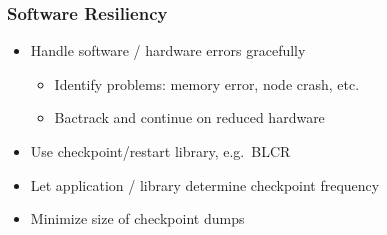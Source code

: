 \begin{frame}[fragile] \frametitle{Software Resiliency}
\begin{itemize}
  \item Handle software / hardware errors gracefully
  \begin{itemize}
     \item Identify problems: memory error, node crash, etc.
     \item Bactrack and continue on reduced hardware
  \end{itemize}
  \item Use checkpoint/restart library, e.g.~BLCR
  \item Let application / library determine checkpoint frequency
  \item Minimize size of checkpoint dumps
  \end{itemize}
\end{frame}
